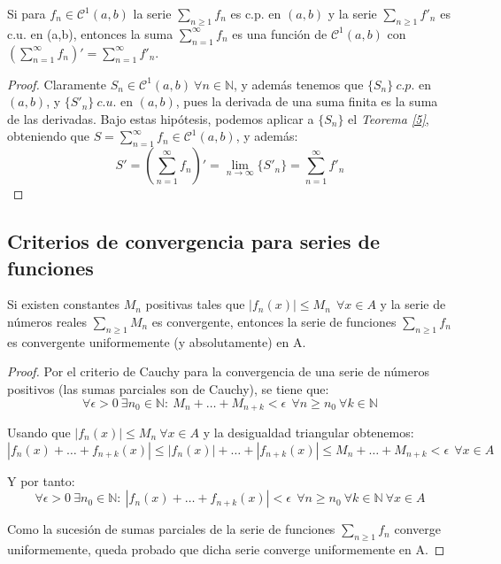 \begin{nth} \label{9}
  Si para $f_n\in \mathcal{C}^1(a,b)$  la serie  $\sum_{n\geq 1} f_n $ es  c.p.  en $(a,b)$ y  la serie  $ \sum_{n\geq 1} f'_n $ es  c.u. en (a,b), entonces la suma $\displaystyle \sum_{n=1}^{\infty} f_n $ es una funci\'on de  $\mathcal{C}^1(a,b)$ con
  $
  \displaystyle \left( \sum_{n=1}^{\infty} f_n \right)' =  \sum_{n=1}^{\infty}  f'_n  .
  $
\end{nth}


  \begin{proof}
    Claramente $S_n \in \mathcal{C}^1(a,b)\ \forall n \in \mathbb{N}$, y además tenemos que $\{S_n\}\ c.p.$ en $(a,b)$, y $\{S'_n\}\ c.u.$ en $(a,b)$, pues la derivada de una suma finita es la suma de las derivadas. Bajo estas hipótesis, podemos aplicar a $\{S_n\}$ el \textit{Teorema \ref{5}}, obteniendo que $S = \sum_{n=1}^{\infty} f_n \in \mathcal{C}^1(a,b)$, y además:
    $$S' = \left( \sum_{n=1}^{\infty} f_n \right)' = \lim_{n \to \infty} \{S'_n\} = \sum_{n=1}^{\infty} f'_n$$
  \end{proof}

\subsection{Criterios de convergencia para series de funciones}

\begin{nth} \label{10}
  Si existen constantes $ M_{n} $ positivas tales que $ |f_{n}(x)| \leq M_{n}\ \ \forall x \in A$ y la serie de números reales $ \sum_{n \ge 1}M_{n} $ es convergente, entonces la serie de funciones $ \sum_{n \ge 1}f_{n} $ es convergente uniformemente (y absolutamente) en A.
\end{nth}

\begin{proof}
    Por el criterio de Cauchy para la convergencia de una serie de números positivos (las sumas parciales son de Cauchy), se tiene que:
    $$ \forall \epsilon > 0\ \exists n_{0} \in \mathbb{N}:\ M_{n} + \dots + M_{n+k} < \epsilon\ \  \forall n \geq n_{0}\ \forall k \in \mathbb{N} $$

    Usando que $ |f_{n}(x)| \leq M_{n}\ \forall x \in A $ y la desigualdad triangular obtenemos:
    $$ |f_{n}(x) + \dots + f_{n+k}(x)| \leq |f_{n}(x)| + \dots + |f_{n+k}(x)| \leq M_{n} + \dots + M_{n+k} < \epsilon\ \ \forall x \in A $$

    Y por tanto:
    $$\forall \epsilon > 0\ \exists n_{0} \in \mathbb{N}:\ |f_{n}(x) + \dots + f_{n+k}(x)| < \epsilon\ \  \forall n \geq n_{0}\ \forall k \in \mathbb{N}\ \forall x \in A $$

    Como la sucesión de sumas parciales de la serie de funciones $\sum_{n\ge 1} f_n$ converge uniformemente, queda probado que dicha serie converge uniformemente en A.
  \end{proof}


